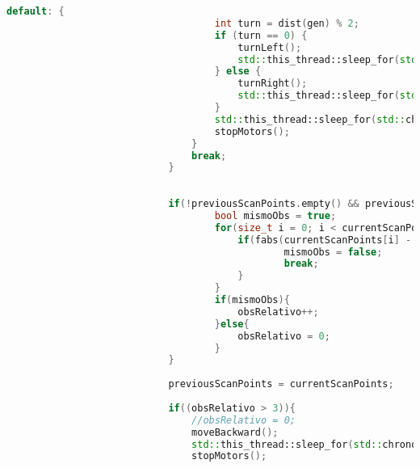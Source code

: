 \begin{lstlisting}[language={C++}, caption={Primer ajuste de c\'odigo}, label={Script}]
                                default: {
                                    int turn = dist(gen) % 2;
                                    if (turn == 0) {
                                        turnLeft();
                                        std::this_thread::sleep_for(std::chrono::seconds(5));
                                    } else {
                                        turnRight();
                                        std::this_thread::sleep_for(std::chrono::seconds(5));
                                    }
                                    std::this_thread::sleep_for(std::chrono::seconds(2));
                                    stopMotors();
                                }
                                break;
                            }
        
                            
                            if(!previousScanPoints.empty() && previousScanPoints.size() == currentScanPoints.size()){
                                    bool mismoObs = true;
                                    for(size_t i = 0; i < currentScanPoints.size(); ++i){
                                        if(fabs(currentScanPoints[i] - previousScanPoints[i]) > 0.05){
                                                mismoObs = false;
                                                break;
                                        }
                                    }
                                    if(mismoObs){
                                        obsRelativo++;
                                    }else{
                                        obsRelativo = 0;
                                    }
                            }
                            
                            previousScanPoints = currentScanPoints;
                            
                            if((obsRelativo > 3)){
                                //obsRelativo = 0;
                                moveBackward();
                                std::this_thread::sleep_for(std::chrono::seconds(3));
                                stopMotors();
                                

\end{lstlisting}
